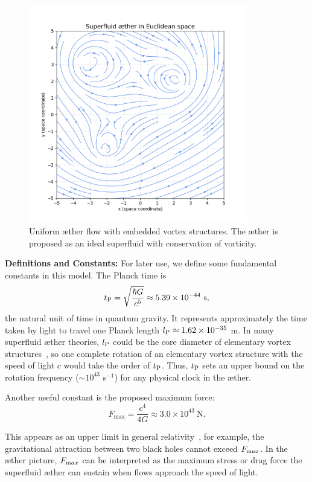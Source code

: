 \begin{figure}[htbp]
    \centering
    \includegraphics[width=0.85\textwidth]{04-ÆtherSuperfluïde}
    \caption{Uniform æther flow with embedded vortex structures. The æther is proposed as an ideal superfluid with conservation of vorticity.}
    \label{fig:ÆtherSuperfluïde}
\end{figure}


\textbf{Definitions and Constants:} For later use, we define some fundamental constants in this model. The Planck time is
\[
    t_{\textrm P} = \sqrt{\frac{\hbar G}{c^5}} \approx 5.39\times10^{-44}\ \text{s},
\]
the natural unit of time in quantum gravity. It represents approximately the time taken by light to travel one Planck length $l_{\textrm P} \approx 1.62\times10^{-35}$ m. In many superfluid æther theories, $l_{\textrm P}$ could be the core diameter of elementary vortex structures~\cite{Winterberg2002-PlanckÆther}, so one complete rotation of an elementary vortex structure with the speed of light $c$ would take the order of $t_{\textrm P}$. Thus, $t_{\textrm P}$ sets an upper bound on the rotation frequency ($\sim 10^{43}$ s$^{-1}$) for any physical clock in the æther.

Another useful constant is the proposed maximum force:
\begin{equation*}
    F_\text{max} = \frac{c^4}{4G} \approx 3.0\times10^{43}\ \text{N}.
\end{equation*}

This appears as an upper limit in general relativity~\cite{Schiller2022-maxforce}, for example, the gravitational attraction between two black holes cannot exceed $F_{\textrm max}$. In the æther picture, $F_{\textrm max}$ can be interpreted as the maximum stress or drag force the superfluid æther can sustain when flows approach the speed of light.

